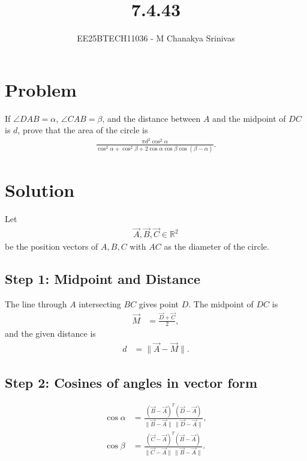 \documentclass[journal]{IEEEtran}
\begin{document}

\vspace{3cm}

\title{7.4.43}
\author{EE25BTECH11036 - M Chanakya Srinivas}
\maketitle

\renewcommand{\thetable}{\theenumi}
\setlength{\intextsep}{10pt}
\renewcommand\theequation{\arabic{equation}}


\section*{Problem}
If $\angle DAB = \alpha$, $\angle CAB = \beta$, and the distance between $A$ and the midpoint of $DC$ is $d$, prove that the area of the circle is \begin{align} \frac{\pi d^2 \cos^2 \alpha}{\cos^2 \alpha + \cos^2 \beta + 2\cos\alpha \cos\beta \cos(\beta - \alpha)}. \end{align}

\section*{Solution}

Let
\begin{align}
\vec{A}, \vec{B}, \vec{C} \in \mathbb{R}^2
\end{align}
be the position vectors of $A,B,C$ with $AC$ as the diameter of the circle.

\subsection*{Step 1: Midpoint and Distance}

The line through $A$ intersecting $BC$ gives point $D$.  
The midpoint of $DC$ is
\begin{align}
\vec{M} &= \frac{\vec{D} + \vec{C}}{2}, \label{eq:M}
\end{align}
and the given distance is
\begin{align}
d &= \|\vec{A} - \vec{M}\|. \label{eq:d}
\end{align}

\subsection*{Step 2: Cosines of angles in vector form}

\begin{align}
\cos \alpha &= \frac{(\vec{B}-\vec{A})^T (\vec{D}-\vec{A})}{\|\vec{B}-\vec{A}\| \, \|\vec{D}-\vec{A}\|}, \label{eq:cosalpha} \\
\cos \beta &= \frac{(\vec{C}-\vec{A})^T (\vec{B}-\vec{A})}{\|\vec{C}-\vec{A}\| \, \|\vec{B}-\vec{A}\|}. \label{eq:cosbeta}
\end{align}
\end{document}
